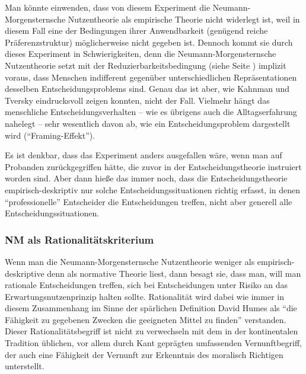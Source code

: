 Man könnte einwenden, dass von diesem Experiment die Neumann-Morgensternsche
Nutzentheorie als empirische Theorie nicht widerlegt ist, weil in diesem Fall
eine der Bedingungen ihrer Anwendbarkeit (genügend reiche Präferenzstruktur)
möglicherweise nicht gegeben ist. Dennoch kommt sie durch dieses Experiment in
Schwierigkeiten, denn die Neumann-Morgensternsche Nutzentheorie setzt mit der
Reduzierbarkeitsbedingung (siehe Seite \pageref{Reduzierbarkeit}) implizit
voraus, dass Menschen indifferent gegenüber unterschiedlichen Repräsentationen
desselben Entscheidungsproblems sind. Genau das ist aber, wie Kahnman und
Tversky eindrucksvoll zeigen konnten, nicht der Fall. Vielmehr hängt das
menschliche Entscheidungsverhalten -- wie es übrigens auch die Alltagserfahrung
nahelegt -- sehr wesentlich davon ab,  wie ein
Entscheidungsproblem dargestellt wird ("`Framing-Effekt"').

Es ist denkbar, dass das Experiment anders ausgefallen wäre, wenn man auf
Probanden zurückgegriffen hätte, die zuvor in der Entscheidungstheorie
instruiert worden sind. Aber dann hieße das immer noch,
dass die Entscheidungstheorie empirisch-deskriptiv nur solche
Entscheidungssituationen richtig erfasst, in denen "`professionelle"'
Entscheider die Entscheidungen treffen, nicht aber generell alle
Entscheidungssituationen.

\subsubsection{NM als Rationalitätskriterium}

Wenn man die Neumann-Mor\-gen\-stern\-sche Nutzentheorie weniger als
empirisch-deskriptive denn als normative Theorie liest, dann besagt sie, dass
man, will man rationale Entscheidungen treffen, sich bei Entscheidungen unter 
Risiko an das
Erwartungsnutzenprinzip halten sollte. Rationalität wird dabei wie immer in
diesem Zusammenhang im Sinne der spärlichen Definition David Humes
als "`die Fähigkeit zu gegebenen Zwecken die geeigneten Mittel zu finden"'
verstanden. Dieser Rationalitätsbegriff ist nicht zu verwechseln mit dem in der
kontinentalen Tradition üblichen, vor allem durch Kant geprägten
umfassenden Vernunftbegriff, der auch eine Fähigkeit der Vernunft zur
Erkenntnis des moralisch Richtigen unterstellt. 

